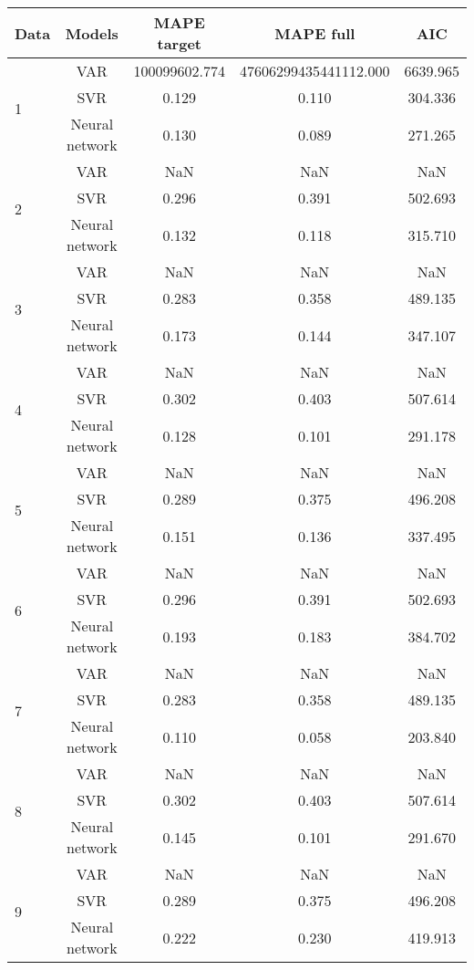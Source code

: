 \documentclass[12pt]{article}
\begin{document}
\begin{table}
\begin{tabular}{|p{2cm}|c|c|c|c|}
\hline
Data & Models &MAPE target & MAPE full & AIC\\ 
\hline
\multirow{3}{*}{1} &VAR &   100099602.774 &    47606299435441112.000 &    6639.965\\ 
\cline{2-5}
 &SVR &   0.129 &    0.110 &    304.336\\ 
\cline{2-5}
 &Neural network &   0.130 &    0.089 &    271.265\\ 
\cline{2-5}
\hline
\multirow{3}{*}{2} &VAR &   NaN &    NaN &    NaN\\ 
\cline{2-5}
 &SVR &   0.296 &    0.391 &    502.693\\ 
\cline{2-5}
 &Neural network &   0.132 &    0.118 &    315.710\\ 
\cline{2-5}
\hline
\multirow{3}{*}{3} &VAR &   NaN &    NaN &    NaN\\ 
\cline{2-5}
 &SVR &   0.283 &    0.358 &    489.135\\ 
\cline{2-5}
 &Neural network &   0.173 &    0.144 &    347.107\\ 
\cline{2-5}
\hline
\multirow{3}{*}{4} &VAR &   NaN &    NaN &    NaN\\ 
\cline{2-5}
 &SVR &   0.302 &    0.403 &    507.614\\ 
\cline{2-5}
 &Neural network &   0.128 &    0.101 &    291.178\\ 
\cline{2-5}
\hline
\multirow{3}{*}{5} &VAR &   NaN &    NaN &    NaN\\ 
\cline{2-5}
 &SVR &   0.289 &    0.375 &    496.208\\ 
\cline{2-5}
 &Neural network &   0.151 &    0.136 &    337.495\\ 
\cline{2-5}
\hline
\multirow{3}{*}{6} &VAR &   NaN &    NaN &    NaN\\ 
\cline{2-5}
 &SVR &   0.296 &    0.391 &    502.693\\ 
\cline{2-5}
 &Neural network &   0.193 &    0.183 &    384.702\\ 
\cline{2-5}
\hline
\multirow{3}{*}{7} &VAR &   NaN &    NaN &    NaN\\ 
\cline{2-5}
 &SVR &   0.283 &    0.358 &    489.135\\ 
\cline{2-5}
 &Neural network &   0.110 &    0.058 &    203.840\\ 
\cline{2-5}
\hline
\multirow{3}{*}{8} &VAR &   NaN &    NaN &    NaN\\ 
\cline{2-5}
 &SVR &   0.302 &    0.403 &    507.614\\ 
\cline{2-5}
 &Neural network &   0.145 &    0.101 &    291.670\\ 
\cline{2-5}
\hline
\multirow{3}{*}{9} &VAR &   NaN &    NaN &    NaN\\ 
\cline{2-5}
 &SVR &   0.289 &    0.375 &    496.208\\ 
\cline{2-5}
 &Neural network &   0.222 &    0.230 &    419.913\\ 
\cline{2-5}
\hline
\end{tabular}
\end{table}
\end{document}
